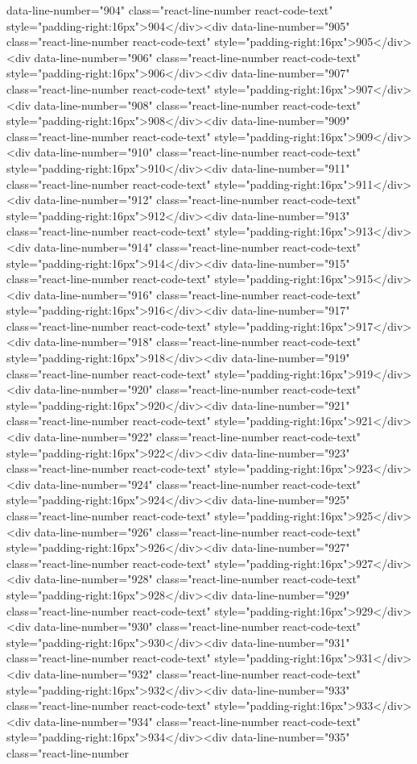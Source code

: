 data-line-number="904" class="react-line-number react-code-text" style="padding-right:16px">904</div><div data-line-number="905" class="react-line-number react-code-text" style="padding-right:16px">905</div><div data-line-number="906" class="react-line-number react-code-text" style="padding-right:16px">906</div><div data-line-number="907" class="react-line-number react-code-text" style="padding-right:16px">907</div><div data-line-number="908" class="react-line-number react-code-text" style="padding-right:16px">908</div><div data-line-number="909" class="react-line-number react-code-text" style="padding-right:16px">909</div><div data-line-number="910" class="react-line-number react-code-text" style="padding-right:16px">910</div><div data-line-number="911" class="react-line-number react-code-text" style="padding-right:16px">911</div><div data-line-number="912" class="react-line-number react-code-text" style="padding-right:16px">912</div><div data-line-number="913" class="react-line-number react-code-text" style="padding-right:16px">913</div><div data-line-number="914" class="react-line-number react-code-text" style="padding-right:16px">914</div><div data-line-number="915" class="react-line-number react-code-text" style="padding-right:16px">915</div><div data-line-number="916" class="react-line-number react-code-text" style="padding-right:16px">916</div><div data-line-number="917" class="react-line-number react-code-text" style="padding-right:16px">917</div><div data-line-number="918" class="react-line-number react-code-text" style="padding-right:16px">918</div><div data-line-number="919" class="react-line-number react-code-text" style="padding-right:16px">919</div><div data-line-number="920" class="react-line-number react-code-text" style="padding-right:16px">920</div><div data-line-number="921" class="react-line-number react-code-text" style="padding-right:16px">921</div><div data-line-number="922" class="react-line-number react-code-text" style="padding-right:16px">922</div><div data-line-number="923" class="react-line-number react-code-text" style="padding-right:16px">923</div><div data-line-number="924" class="react-line-number react-code-text" style="padding-right:16px">924</div><div data-line-number="925" class="react-line-number react-code-text" style="padding-right:16px">925</div><div data-line-number="926" class="react-line-number react-code-text" style="padding-right:16px">926</div><div data-line-number="927" class="react-line-number react-code-text" style="padding-right:16px">927</div><div data-line-number="928" class="react-line-number react-code-text" style="padding-right:16px">928</div><div data-line-number="929" class="react-line-number react-code-text" style="padding-right:16px">929</div><div data-line-number="930" class="react-line-number react-code-text" style="padding-right:16px">930</div><div data-line-number="931" class="react-line-number react-code-text" style="padding-right:16px">931</div><div data-line-number="932" class="react-line-number react-code-text" style="padding-right:16px">932</div><div data-line-number="933" class="react-line-number react-code-text" style="padding-right:16px">933</div><div data-line-number="934" class="react-line-number react-code-text" style="padding-right:16px">934</div><div data-line-number="935" class="react-line-number 